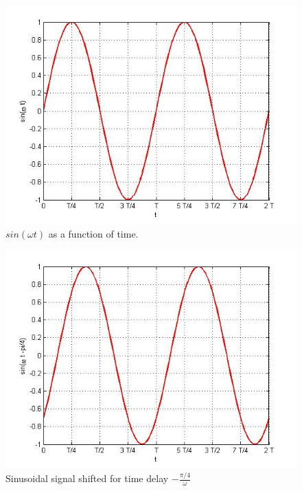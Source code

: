 \documentclass{ximera}
\begin{document}
\begin{figure}
\includegraphics[scale=0.4]{jpg/cpef1.jpg}
\caption{$sin ( \omega t)$ as a function of time.} \label{sin}
\end{figure}


\begin{figure}
\includegraphics[scale=0.4]{jpg/cpef2.jpg}
\caption{ Sinusoidal signal shifted for time delay $-\frac{\pi/4}{\omega}$}
\label{sinMinus45T}
\end{figure}
\end{document}
